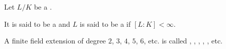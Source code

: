 \begin{definition} \label{definition:finite_field_extension}
Let $L/K$ be a .

It is said to be a  and $L$ is said to be a  if $[L:K] < \infty$.

A finite field extension of degree $2$, $3$, $4$, $5$, $6$, etc. is called , , , , , etc.
\end{definition}